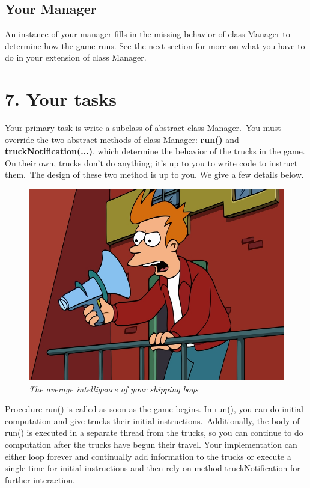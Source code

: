 \documentclass[11pt]{article}
\begin{document}
\subsection{Your Manager}
An instance of your manager fills in the missing behavior of class Manager to determine how the game runs. See the next section for more on what you have to do in your extension of class Manager.

\newpage
\section{7. Your tasks}
Your primary task is write a subclass of abstract class Manager.\ You must override the two abstract methods of class Manager: \textbf{run()} and \textbf{truckNotification(...)}, which determine the behavior of the trucks in the game. On their own, trucks don't do anything; it's up to you to write code to instruct them.\ The
design of these two method is up to you. We give a few details below.\\

\begin{figure}[h]
\centerline{\includegraphics[scale=0.2]{fry.jpg}} 
\caption{\em{The average intelligence of your shipping boys}}
\end{figure}

Procedure run() is called as soon as the game begins. In run(), you can do initial computation and give trucks their initial instructions.\ Additionally, the body of run() is executed in a separate thread from the trucks, so you can continue to do computation after the trucks have begun their travel. Your implementation can either loop forever and continually add information to the trucks or execute a single time for initial instructions and then rely on method truckNotification for further interaction.\\
\end{document}
